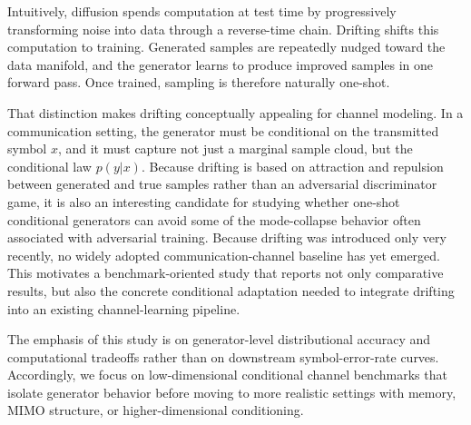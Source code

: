 \documentclass[conference]{IEEEtran}
\begin{document}
Intuitively, diffusion spends computation at test time by progressively transforming noise into data through a reverse-time chain.
Drifting shifts this computation to training.
Generated samples are repeatedly nudged toward the data manifold, and the generator learns to produce improved samples in one forward pass.
Once trained, sampling is therefore naturally one-shot.

That distinction makes drifting conceptually appealing for channel modeling.
In a communication setting, the generator must be conditional on the transmitted symbol \(x\), and it must capture not just a marginal sample cloud, but the conditional law \(p(y | x)\). Because drifting is based on attraction and repulsion between generated and true samples rather than an adversarial discriminator game, it is also an interesting candidate for studying whether one-shot conditional generators can avoid some of the mode-collapse behavior often associated with adversarial training.
Because drifting was introduced only very recently, no widely adopted communication-channel baseline has yet emerged. This motivates a benchmark-oriented study that reports not only comparative results, but also the concrete conditional adaptation needed to integrate drifting into an existing channel-learning pipeline. 

The emphasis of this study is on generator-level distributional accuracy and computational tradeoffs rather than on downstream symbol-error-rate curves. Accordingly, we focus on low-dimensional conditional channel benchmarks that isolate generator behavior before moving to more realistic settings with memory, MIMO structure, or higher-dimensional conditioning.
\end{document}
